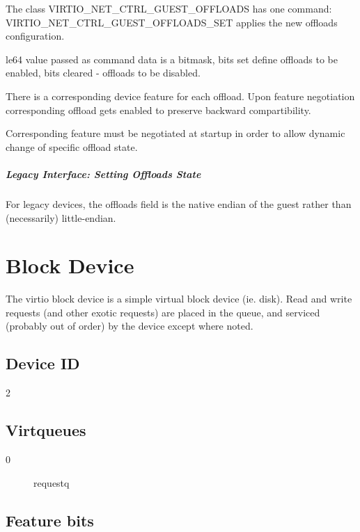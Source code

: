 The class VIRTIO_NET_CTRL_GUEST_OFFLOADS has one command:
VIRTIO_NET_CTRL_GUEST_OFFLOADS_SET applies the new offloads configuration.

le64 value passed as command data is a bitmask, bits set define
offloads to be enabled, bits cleared - offloads to be disabled.

There is a corresponding device feature for each offload. Upon feature
negotiation corresponding offload gets enabled to preserve backward
compartibility.

Corresponding feature must be negotiated at startup in order to allow dynamic
change of specific offload state.


\subparagraph{Legacy Interface: Setting Offloads State}\label{sec:Device Types / Network Device / Device Operation / Control Virtqueue / Offloads State Configuration / Setting Offloads State / Legacy Interface: Setting Offloads State}
For legacy devices, the offloads field is the
native endian of the guest rather than (necessarily) little-endian.


\section{Block Device}\label{sec:Device Types / Block Device}

The virtio block device is a simple virtual block device (ie.
disk). Read and write requests (and other exotic requests) are
placed in the queue, and serviced (probably out of order) by the
device except where noted.

\subsection{Device ID}\label{sec:Device Types / Block Device / Device ID}
  2

\subsection{Virtqueues}\label{sec:Device Types / Block Device / Virtqueues}
\begin{description}
\item[0] requestq
\end{description}

\subsection{Feature bits}\label{sec:Device Types / Block Device / Feature bits}

